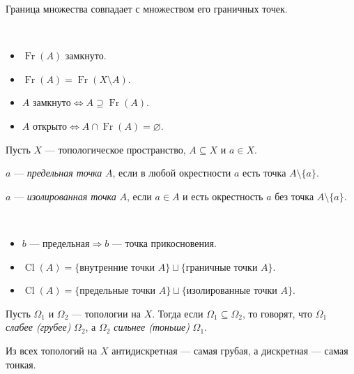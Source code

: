 \documentclass[12pt,a4paper]{article}
\DeclareMathOperator{\Cl}{Cl}
\DeclareMathOperator{\Fr}{Fr}
\begin{document}
    \begin{theorem}
        Граница множества совпадает с множеством его граничных точек.
    \end{theorem}

    \begin{theorem}\ 
        \begin{itemize}
            \item $\Fr(A)$ замкнуто.
            \item $\Fr(A) = \Fr(X \setminus A)$.
            \item $A\text{ замкнуто} \Leftrightarrow A \supseteq \Fr(A)$.
            \item $A\text{ открыто} \Leftrightarrow A \cap \Fr(A) = \varnothing$.
        \end{itemize}
    \end{theorem}

    \begin{definition}
        Пусть $X$ --- топологическое пространство, $A \subseteq X$ и $a \in X$.

        $a$ --- \emph{предельная точка} $A$, если в любой окрестности $a$ есть точка $A \setminus \{a\}$.

        $a$ --- \emph{изолированная точка} $A$, если $a \in A$ и есть окрестность $a$ без точка $A \setminus \{a\}$.
    \end{definition}

    \begin{theorem}\ 
        \begin{itemize}
            \item $b\text{ --- предельная} \Rightarrow b\text{ --- точка прикосновения}$.
            \item $\Cl(A) = \{\text{внутренние точки $A$}\} \sqcup \{\text{граничные точки $A$}\}$.
            \item $\Cl(A) = \{\text{предельные точки $A$}\} \sqcup \{\text{изолированные точки $A$}\}$.
        \end{itemize}
    \end{theorem}

    \begin{definition}
        Пусть $\Omega_1$ и $\Omega_2$ --- топологии на $X$. Тогда если $\Omega_1 \subseteq \Omega_2$, то говорят, что $\Omega_1$ \emph{слабее (грубее)} $\Omega_2$, а $\Omega_2$ \emph{сильнее (тоньше)} $\Omega_1$.
    \end{definition}

    \begin{example}
        Из всех топологий на $X$ антидискретная --- самая грубая, а дискретная --- самая тонкая.
    \end{example}
\end{document}
